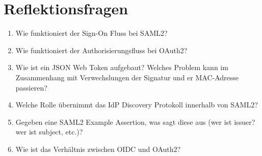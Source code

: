 \section{Reflektionsfragen}

\begin{enumerate}
	\item Wie funktioniert der Sign-On Fluss bei SAML2?
	\item Wie funktioniert der Authorisierungsfluss bei OAuth2?
	\item Wie ist ein JSON Web Token aufgebaut? Welches Problem kann im Zusammenhang mit Verwechslungen der Signatur und er MAC-Adresse passieren?
	\item Welche Rolle übernimmt das IdP Discovery Protokoll innerhalb von SAML2?
	\item Gegeben eine SAML2 Example Assertion, was sagt diese aus (wer ist issuer? wer ist subject, etc.)?
	\item Wie ist das Verhältnis zwischen OIDC und OAuth2?
\end{enumerate}
